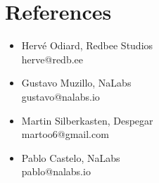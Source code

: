 \documentclass{vitae}
\begin{document}
\section*{References}
\begin{multicols}{2}
    \begin{itemize}
    \item Hervé Odiard, Redbee Studios\\
    herve@redb.ee
    \item Gustavo Muzillo, NaLabs\\
    gustavo@nalabs.io
    \item Martin Silberkasten, Despegar\\
    martoo6@gmail.com
    \item Pablo Castelo, NaLabs\\
    pablo@nalabs.io
    \end{itemize}
\end{multicols}
\end{document}
